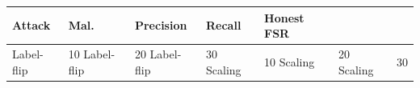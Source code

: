 \begin{tabular}{lllll}
\toprule
Attack & Mal. & Precision & Recall & Honest FSR \\
\midrule
Label-flip & 10%
Label-flip & 20%
Label-flip & 30%
Scaling & 10%
Scaling & 20%
Scaling & 30%
\bottomrule
\end{tabular}
